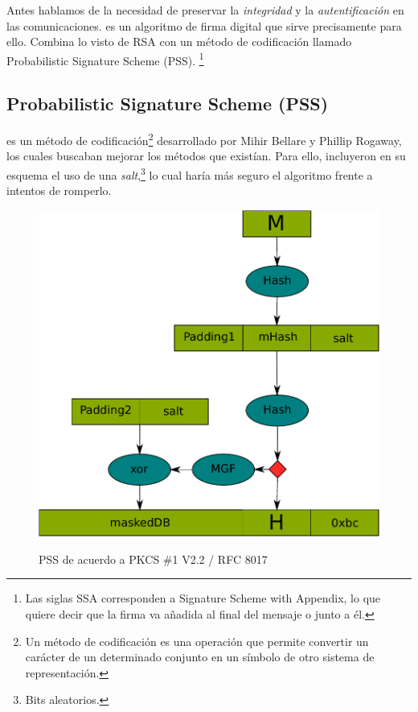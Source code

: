  Antes hablamos de la necesidad de preservar la \emph{integridad} y la \emph{autentificación} en las comunicaciones.
  es un algoritmo de firma digital que sirve precisamente para ello.
 Combina lo visto de RSA con un método de codificación llamado Probabilistic Signature Scheme (PSS).
 \footnote{Las siglas SSA corresponden a Signature Scheme with Appendix, lo que quiere decir que la firma va añadida al final del mensaje o junto a él.}

 \subsection{Probabilistic Signature Scheme (PSS)}

  es un método de codificación\footnote{Un método de codificación es una operación que permite convertir un carácter de un determinado conjunto en un símbolo de otro sistema de representación.}
 desarrollado por Mihir Bellare y Phillip Rogaway, los cuales buscaban mejorar los métodos que existían.
 Para ello, incluyeron en su esquema el uso de una \emph{salt},\footnote{Bits aleatorios.} lo cual haría más seguro el algoritmo frente a intentos de romperlo. \emph{\parencite{Reference15}}

 \begin{figure}[ht]
   \centering
   \includegraphics[scale=2.0]{Figures/PSS}
   \decoRule
   \caption[PSS (Esquema)]{PSS de acuerdo a PKCS \#1 V2.2 / RFC 8017} \emph{\parencite{Reference16}}
   \label{fig:PSS}
 \end{figure}


